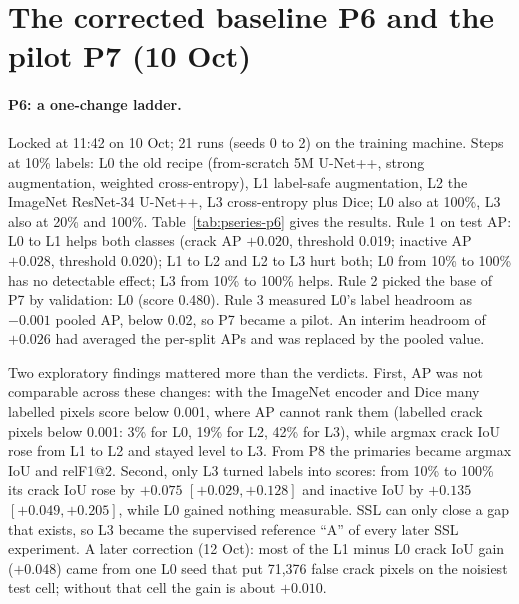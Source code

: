 \section{The corrected baseline P6 and the pilot P7 (10 Oct)}\label{sec:pseries-p6}

\paragraph{P6: a one-change ladder.} Locked at 11:42 on 10 Oct; 21 runs (seeds 0 to 2) on the training machine. Steps at 10\%
labels: L0 the old recipe (from-scratch 5M U-Net++, strong augmentation, weighted cross-entropy), L1 label-safe augmentation, L2 the
ImageNet ResNet-34 U-Net++, L3 cross-entropy plus Dice; L0 also at 100\%, L3 also at 20\% and 100\%. Table~\ref{tab:pseries-p6}
gives the results. Rule 1 on test AP: L0 to L1 helps both classes (crack AP $+0.020$, threshold 0.019; inactive AP $+0.028$,
threshold 0.020); L1 to L2 and L2 to L3 hurt both; L0 from 10\% to 100\% has no detectable effect; L3 from 10\% to 100\% helps.
Rule 2 picked the base of P7 by validation: L0 (score 0.480). Rule 3 measured L0's label headroom as $-0.001$ pooled AP, below
0.02, so P7 became a pilot. An interim headroom of $+0.026$ had averaged the per-split APs and was replaced by the pooled value.

Two exploratory findings mattered more than the verdicts. First, AP was not comparable across these changes: with the ImageNet
encoder and Dice many labelled pixels score below 0.001, where AP cannot rank them (labelled crack pixels below 0.001: 3\% for L0,
19\% for L2, 42\% for L3), while argmax crack IoU rose from L1 to L2 and stayed level to L3. From P8 the primaries became argmax
IoU and relF1@2. Second, only L3 turned labels into scores: from 10\% to 100\% its crack IoU rose by $+0.075$ $[+0.029, +0.128]$ and
inactive IoU by $+0.135$ $[+0.049, +0.205]$, while L0 gained nothing measurable. SSL can only close a gap that exists, so L3 became
the supervised reference ``A'' of every later SSL experiment. A later correction (12 Oct): most of the L1 minus L0 crack IoU gain
($+0.048$) came from one L0 seed that put 71,376 false crack pixels on the noisiest test cell; without that cell the gain is about
$+0.010$.


